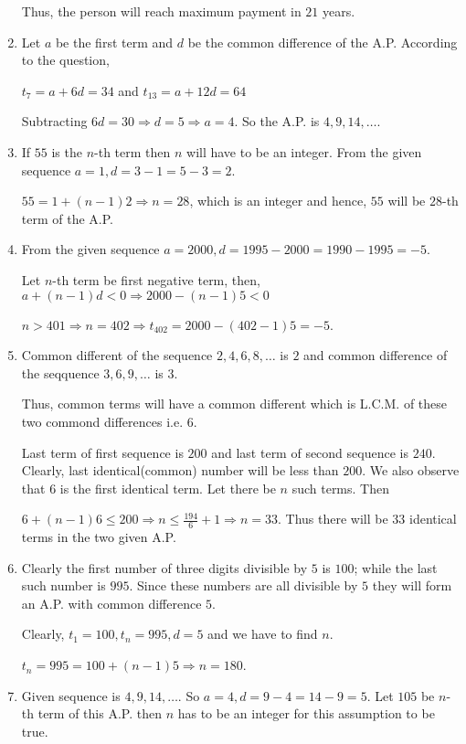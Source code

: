 \begin{enumerate}
  Thus, the person will reach maximum payment in $21$ years.
\item Let $a$ be the first term and $d$ be the common difference of the A.P. According to the question,

  $t_7 = a + 6d = 34$ and $t_{13} = a + 12d = 64$

  Subtracting $6d = 30 \Rightarrow d = 5 \Rightarrow a = 4$. So the A.P. is $4, 9, 14, \ldots$.
\item If $55$ is the $n$-th term then $n$ will have to be an integer. From the given sequence $a = 1, d = 3 - 1 = 5 - 3 = 2$.

  $55 = 1 + (n - 1)2 \Rightarrow n = 28$, which is an integer and hence, $55$ will be $28$-th term of the A.P.
\item From the given sequence $a = 2000, d = 1995 - 2000 = 1990 - 1995 = -5$.

  Let $n$-th term be first negative term, then, $a + (n - 1)d < 0 \Rightarrow 2000 -(n - 1)5 < 0$

  \Rightarrow $n > 401 \Rightarrow n = 402 \Rightarrow t_{402} = 2000 - (402 - 1)5 = -5$.
\item Common different of the sequence $2, 4, 6, 8, \ldots$ is $2$ and common difference of the seqquence $3, 6, 9, \ldots$ is $3$.

  Thus, common terms will have a common different which is L.C.M. of these two commond differences i.e. $6$.

  Last term of first sequence is $200$ and last term of second sequence is $240$. Clearly, last identical(common) number will be
  less than $200$. We also observe that $6$ is the first identical term. Let there be $n$ such terms. Then

  $6 + (n - 1)6 \leq 200 \Rightarrow n\leq \frac{194}{6} + 1 \Rightarrow n = 33$. Thus there will be $33$ identical terms in the two
  given A.P.
\item Clearly the first number of three digits divisible by $5$ is $100$; while the last such number is $995$. Since these numbers
  are all divisible by $5$ they will form an A.P. with common difference $5$.

  Clearly, $t_1 = 100, t_n = 995, d = 5$ and we have to find $n$.

  $t_n = 995 = 100 + (n - 1)5\Rightarrow n = 180$.
\item Given sequence is $4, 9, 14, \ldots$. So $a = 4, d = 9 - 4 = 14 - 9 = 5$. Let $105$ be $n$-th term of this A.P. then $n$ has
  to be an integer for this assumption to be true.


\end{enumerate}
